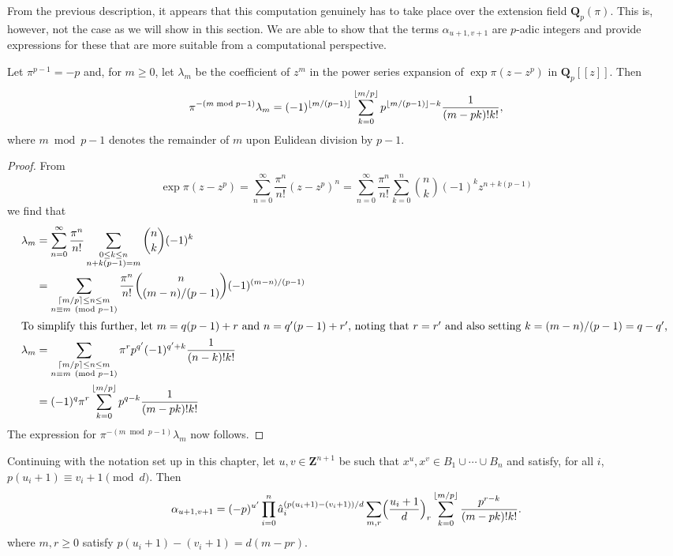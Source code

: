 From the previous description, it appears that this computation 
genuinely has to take place over the extension field 
$\mathbf{Q}_p(\pi)$.  This is, however, not the case as we 
will show in this section.  We are able to show that the terms 
$\alpha_{u+1,v+1}$ are $p$-adic integers and provide expressions 
for these that are more suitable from a computational perspective.  

\begin{lem} \label{lem:lambdam}
Let $\pi^{p-1} = -p$ and, for $m \geq 0$, let $\lambda_m$ 
be the coefficient of $z^m$ in the power series expansion 
of $\exp \pi (z - z^p)$ in $\mathbf{Q}_p[[z]]$.  Then 
\begin{equation*}
\pi^{- (m \bmod {p-1})} \lambda_m = (-1)^{\left\lfloor m/(p-1)\right\rfloor} \sum_{k=0}^{\left\lfloor m/p\right\rfloor} p^{\left\lfloor m/(p-1)\right\rfloor - k} \frac{1}{(m-pk)! k!},
\end{equation*}
where $m \bmod{p-1}$ denotes the remainder of $m$ upon Eulidean 
division by $p-1$.
\end{lem}

\begin{proof}
From
\begin{equation*}
\exp \pi (z - z^p) = \sum_{n=0}^{\infty} \frac{\pi^n}{n!} (z - z^p) ^n
                   = \sum_{n=0}^{\infty} \frac{\pi^n}{n!} \sum_{k=0}^n \binom{n}{k} (-1)^k z^{n + k(p-1)}
\end{equation*}
we find that 
\begin{align*}
\lambda_m & = \sum_{n = 0}^{\infty} \frac{\pi^n}{n!} \sum_{\substack{0 \leq k \leq n\\n + k(p-1) = m}} \binom{n}{k} (-1)^k \\
          & = \sum_{\substack{\left\lceil m/p\right\rceil \leq n \leq m\\ n \equiv m \pmod{p-1}}} \frac{\pi^n}{n!} \binom{n}{(m-n)/(p-1)} (-1)^{(m-n)/(p-1)} \\
\intertext{To simplify this further, let $m = q(p-1) + r$ and 
$n = q'(p-1) + r'$, noting that $r = r'$ and also setting 
$k = (m-n)/(p-1) = q - q'$, }
\lambda_m & = \sum_{\substack{\left\lceil m/p\right\rceil \leq n \leq m\\ n \equiv m \pmod{p-1}}} \pi^r p^{q'} (-1)^{q' + k} \frac{1}{(n-k)! k!} \\
          & = (-1)^q \pi^r \sum_{k=0}^{\left\lfloor m/p\right\rfloor} p^{q - k} \frac{1}{(m - pk)!k!}
\end{align*}
The expression for $\pi^{-(m \bmod{p-1})} \lambda_m$ now follows.
\end{proof}

\begin{thm} \label{thm:alpha}
Continuing with the notation set up in this chapter, let 
$u, v \in \mathbf{Z}^{n+1}$ be such that 
$x^u, x^v \in B_1 \cup \dotsb \cup B_n$ and satisfy, 
for all $i$, $p (u_i + 1) \equiv v_i + 1 \pmod{d}$. 
Then 
\begin{equation*}
\alpha_{u+1,v+1} = (-p)^{u'} \prod_{i=0}^n 
    \hat{a}_i^{(p (u_i + 1) - (v_i + 1))/d} \sum_{m,r} 
    \Bigl(\frac{u_i+1}{d}\Bigr)_r 
    \sum_{k=0}^{\left\lfloor m/p\right\rfloor} \frac{p^{r-k}}{(m-pk)! k!}.
\end{equation*}
where $m, r \geq 0$ satisfy $p (u_i + 1) - (v_i + 1) = d (m - pr)$. 
\end{thm}

